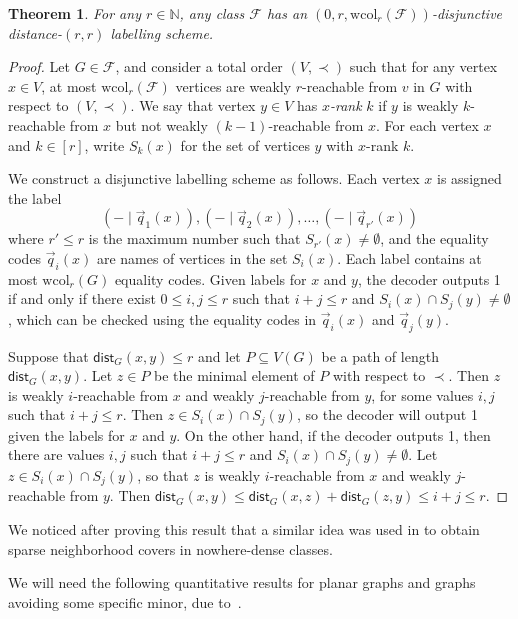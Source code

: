 \documentclass[11pt]{article}
\newtheorem{thm}{Theorem}[section]
\theoremstyle{definition}
\newcommand{\wcol}{\mathrm{wcol}}
\renewcommand{\leq}{\leqslant}
\def\F {{\mathcal F}}
\def\bN{{\mathbb N}}
\newcommand{\dist}{\mathsf{dist}}
\begin{document}
\begin{thm}\label{thm:distr1}
For any $r \in \bN$, any class $\F$ has an $(0, r, \wcol_r(\F))$-disjunctive
distance-$(r,r)$ labelling scheme.
\end{thm}
\begin{proof}
Let $G \in \F$, and consider a total order $(V, \prec)$ such that for any vertex $x \in V$, at most
$\wcol_r(\F)$ vertices are weakly $r$-reachable from $v$ in $G$ with respect to $(V,\prec)$. We say
that vertex $y \in V$ has \emph{$x$-rank} $k$ if $y$ is weakly $k$-reachable from $x$ but not weakly
$(k-1)$-reachable from $x$. For each vertex $x$ and $k \in [r]$, write $S_k(x)$ for the set of
vertices $y$ with $x$-rank $k$.

We construct a disjunctive labelling scheme as follows. Each vertex $x$ is assigned the label
\[
  (- \mid \vec q_1(x)), (- \mid \vec q_2(x)), \dotsc, (- \mid \vec q_{r'}(x))
\]
where $r' \leq r$ is the maximum number such that $S_{r'}(x) \neq \emptyset$, and the equality codes
$\vec q_i(x)$ are names of vertices in the set $S_i(x)$. Each label contains at most $\wcol_r(G)$
equality codes. Given labels for $x$ and $y$, the decoder outputs 1 if and only if there exist $0
\leq i,j \leq r$ such that $i+j \leq r$ and $S_i(x) \cap S_j(y) \neq \emptyset$, which can be
checked using the equality codes in $\vec q_i(x)$ and $\vec q_j(y)$.

Suppose that $\dist_G(x,y) \leq r$ and let $P \subseteq V(G)$ be a path of length $\dist_G(x,y)$.
Let $z \in P$ be the minimal element of $P$ with respect to $\prec$. Then $z$ is weakly
$i$-reachable from $x$ and weakly $j$-reachable from $y$, for some values $i,j$ such that $i+j \leq
r$. Then $z \in S_i(x) \cap S_j(y)$, so the decoder will output 1 given the labels for $x$ and $y$.
On the other hand, if the decoder outputs 1, then there are values $i,j$ such that $i + j \leq r$
and $S_i(x) \cap S_j(y) \neq \emptyset$. Let $z \in S_i(x) \cap S_j(y)$, so that $z$ is weakly
$i$-reachable from $x$ and weakly $j$-reachable from $y$. Then $\dist_G(x,y) \leq \dist_G(x,z) +
\dist_G(z,y) \leq i + j \leq r$.
\end{proof}


We noticed after proving this result that a similar idea was used in \cite[Lemma
6.10]{GKS17} to obtain sparse neighborhood covers in nowhere-dense classes.

We will need the following quantitative results for planar graphs
and graphs avoiding some specific minor, due to~\cite{HOQRS17}.
\end{document}
